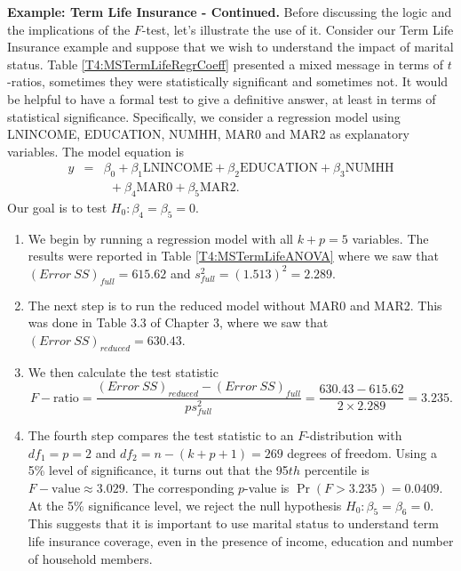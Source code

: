 \textbf{Example: Term Life Insurance - Continued.} Before discussing
the logic and the implications of the $F$-test, let's illustrate the
use of it. Consider our Term Life Insurance example and suppose that
we wish to understand the impact of marital status. Table
\ref{T4:MSTermLifeRegrCoeff} presented a mixed message in terms of
$t$-ratios, sometimes they were statistically significant and
sometimes not. It would be helpful to have a formal test to give a
definitive answer, at least in terms of statistical significance.
Specifically, we consider a regression model using LNINCOME,
EDUCATION, NUMHH, MAR0 and MAR2 as explanatory variables. The model
equation is
\begin{eqnarray*}
y &=& \beta_0 + \beta_1 \textrm{LNINCOME} +\beta_2
\textrm{EDUCATION} + \beta_3 \textrm{NUMHH} \\
 & & ~~ +\beta_4 \textrm{MAR0} +\beta_5\textrm{MAR2}.
\end{eqnarray*}
Our goal is to test $H_0: \beta_4 = \beta_5 = 0 $.

\begin{enumerate}
\item We begin by running a regression model
with all $k+p=5$ variables. The results were reported in Table
\ref{T4:MSTermLifeANOVA} where we saw that $(Error~SS)_{full} =
615.62$ and $s_{full}^2 = (1.513)^2 = 2.289$.

\item The next step is to run the reduced model without MAR0 and MAR2.
This was done in Table 3.3 of Chapter 3, where we saw that
$(Error~SS)_{reduced} = 630.43.$

\item We then calculate the test statistic
\begin{equation*}
F-\textrm{ratio}=\frac{(Error~SS)_{reduced}-(Error~SS)_{full}}{ps_{full}^2}
= \frac{630.43 -615.62}{2 \times 2.289} = 3.235 .
\end{equation*}

\item The fourth step compares the test statistic to an $F$-distribution with
$df_1=p=2$ and $df_2 = n-(k+p+1) = 269$ degrees of freedom. Using a
5\% level of significance, it turns out that the 95$th$ percentile
is $F-\textrm{value} \approx 3.029$. The corresponding $p$-value is
$\Pr(F > 3.235) = 0.0409$. At the 5\% significance level, we reject
the null hypothesis $H_0:\beta_5=\beta_6=0$. This suggests that it
is important to use marital status to understand term life insurance
coverage, even in the presence of income, education and number of
household members.

\end{enumerate}


